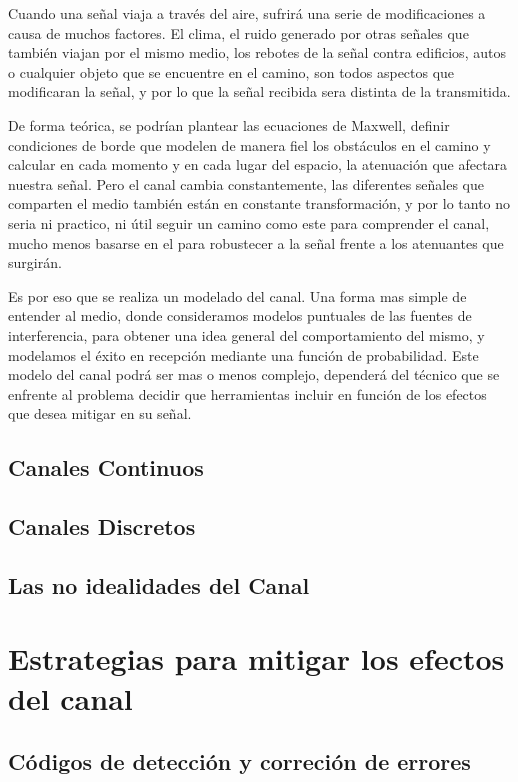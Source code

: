 Cuando una señal viaja a través del aire, sufrirá una serie de modificaciones a causa de muchos factores. El clima, el ruido generado por otras señales que también viajan por el mismo medio, los rebotes de la señal contra edificios, autos o cualquier objeto que se encuentre en el camino, son todos aspectos que modificaran la señal, y por lo que la señal recibida sera distinta de la transmitida. 

De forma teórica, se podrían plantear las ecuaciones de Maxwell, definir condiciones de borde que modelen de manera fiel los obstáculos en el camino y calcular en cada momento y en cada lugar del espacio, la atenuación que afectara nuestra señal. Pero el canal cambia constantemente, las diferentes señales que comparten el medio también están en constante transformación, y por lo tanto no seria ni practico, ni útil seguir un camino como este para comprender el canal, mucho menos basarse en el para robustecer a la señal frente a los atenuantes que surgirán. 

Es por eso que se realiza un modelado del canal. Una forma mas simple de entender al medio, donde consideramos modelos puntuales de las fuentes de interferencia, para obtener una idea general del comportamiento del mismo, y modelamos el éxito en recepción mediante una función de probabilidad. Este modelo del canal podrá ser mas o menos complejo, dependerá del técnico que se enfrente al problema decidir que herramientas incluir en función de los efectos que desea mitigar en su señal.

	\subsection{Canales Continuos}
	\subsection{Canales Discretos}
	\subsection{Las no idealidades del Canal}


\section{Estrategias para mitigar los efectos del canal}

	\subsection{C\'odigos de detecci\'on y correci\'on de errores}

